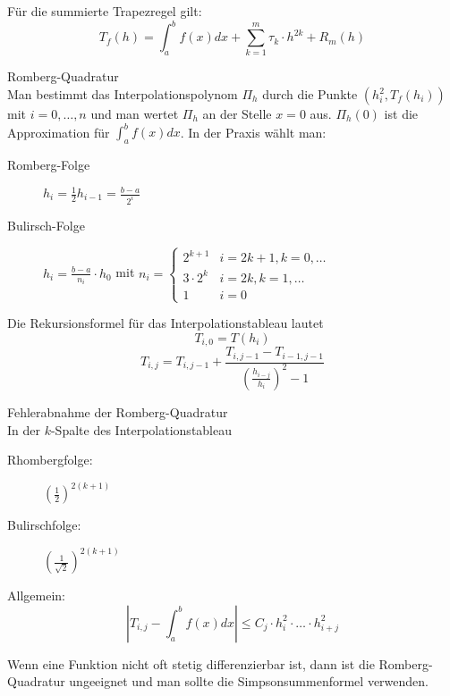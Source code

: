 \begin{corollary}
	[Korollar I.10]
	Für die summierte Trapezregel gilt:
	$$T_{f}(h)=\int_{a}^{b}f(x)dx+\sum_{k=1}^{m}\tau_{k}\cdot h^{2k}+R_{m}(h)$$
\end{corollary}

\begin{definition}
	[Definition I.11] Romberg-Quadratur
	\\
	Man bestimmt das Interpolationspolynom $\Pi_{h}$ durch die Punkte $(h_{i}^{2},T_{f}(h_{i}))$ mit $i=0,\ldots,n$ und man wertet
	$\Pi_{h}$ an der Stelle $x=0$  aus. $\Pi_{h}(0)$ ist die Approximation für $\int_{a}^{b}f(x)dx$. In der Praxis wählt man:
	\begin{description}
		\item[Romberg-Folge] $h_{i}=\frac{1}{2}h_{i-1}=\frac{b-a}{2^{i}}$
		\item[Bulirsch-Folge] $h_{i}=\frac{b-a}{n_{i}}\cdot h_{0}$  mit $n_{i}=
		\begin{cases}
			2^{k+1}&i=2k+1,k=0,\ldots\\
			3\cdot 2^{k}&i=2k,k=1,\ldots\\
			1 & i=0	
		\end{cases}$
	\end{description}
	Die Rekursionsformel für das Interpolationstableau lautet
	$$T_{i,0}=T(h_{i})$$
	$$T_{i,j}=T_{i,j-1}+\frac{T_{i,j-1}-T_{i-1,j-1}}{\left(\frac{h_{i-j}}{h_{i}}\right)^{2}-1}$$
\end{definition}

\begin{theorem}
	[Satz I.12] Fehlerabnahme der Romberg-Quadratur
	\\
	In der $k$-Spalte des Interpolationstableau
	\begin{description}
		\item[Rhombergfolge:] $\left(\frac{1}{2}\right)^{2(k+1)}$
		\item[Bulirschfolge:] $\left(\frac{1}{\sqrt{2}}\right)^{2(k+1)}$
	\end{description}
	Allgemein:
	$$|T_{i,j}-\int_{a}^{b}f(x)dx| \leq C_{j}\cdot h_{i}^{2}\cdot \ldots \cdot h_{i+j}^{2}$$
\end{theorem}

\begin{remark}
Wenn eine Funktion nicht oft stetig differenzierbar ist, dann ist die Romberg-Quadratur ungeeignet und man sollte die Simpsonsummenformel verwenden.
\end{remark}
